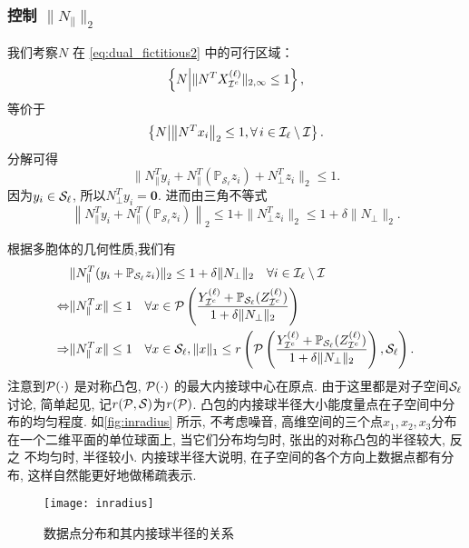 \subsubsection{控制 \(\|N_{\parallel}\|_2\)}
我们考察\(N\) 在 \eqref{eq:dual_fictitious2} 中的可行区域：
\[\left\{N \middle| \|N^T X^{(\ell)}_{\mathcal{I}^c}\|_{2,\infty} \leq 1\right\},\]
等价于
\[\left\{N \middle|\left \| N^T x_i\right\|_2 \leq 1 , \forall \, i \in \mathcal{I}_\ell
\setminus \mathcal{I} \right\}.\]
分解可得
\[\| N_{\parallel}^T y_i+N_{\parallel}^T (\mathbb{P}_{\mathcal{S}_{\ell}}z_i)+
N_{\perp}^T z_i\|_2 \leq 1.\]
因为\(y_i \in \mathcal{S}_\ell\), 所以\(N_\perp^T y_i=\mathbf{0}\). 进而由三角不等式
\begin{equation}\label{eq:relax_constraint}
  \left\| N_{\parallel}^T y_i+N_{\parallel}^T
  (\mathbb{P}_{\mathcal{S}_{\ell}}z_i)\right \|_2
  \leq 1+\|N_{\perp}^T z_i\|_2 \leq 1+\delta\|N_{\perp}\|_2.
\end{equation}

根据多胞体的几何性质,我们有
\begin{align}
  & \| N_{\parallel}^T (y_i+ \mathbb{P}_{\mathcal{S}_{\ell}}z_i) \|_2 \leq
  1+\delta\|N_{\perp}\|_2 \quad \forall i \in \mathcal{I}_\ell \setminus \mathcal{I}\nonumber\\
  \Leftrightarrow & \|N_{\parallel}^T x\| \leq 1 \quad \forall x \in \mathcal{P}\left(\frac{Y_{\mathcal{I}^c}^{(\ell)}+
  \mathbb{P}_{\mathcal{S}_{\ell}}(Z_{\mathcal{I}^c}^{(\ell)})}{1+\delta\|N_{\perp}\|_2}\right)
  \nonumber\\
  \Rightarrow & \|N_{\parallel}^T x\| \leq 1 \quad \forall x \in \mathcal{S}_\ell,
  \|x\|_1 \le r\left(\mathcal{P}\left(\frac{Y_{\mathcal{I}^c}^{(\ell)}+
  \mathbb{P}_{\mathcal{S}_{\ell}}(Z_{\mathcal{I}^c}^{(\ell)})}{1+\delta\|N_{\perp}\|_2}\right),
  \mathcal{S}_\ell\right).\label{eq:Geometric_dual}
\end{align}
注意到\(\mathcal{P}(\cdot)\) 是对称凸包, \(\mathcal{P}(\cdot)\) 的最大内接球中心在原点.
由于这里都是对子空间\(\mathcal{S}_\ell\)讨论, 简单起见, 记\(r(\mathcal{P}, \mathcal{S})\)为\(r(\mathcal{P})\).
凸包的内接球半径大小能度量点在子空间中分布的均匀程度.
如\autoref{fig:inradius} 所示, 不考虑噪音, 高维空间的三个点\(x_1, x_2,
x_3\)分布在一个二维平面的单位球面上, 当它们分布均匀时, 张出的对称凸包的半径较大, 反之
不均匀时, 半径较小. 内接球半径大说明, 在子空间的各个方向上数据点都有分布,
这样自然能更好地做稀疏表示.

\begin{figure}[tb]
  \centering
  \texttt{[image: inradius]}
  \caption{数据点分布和其内接球半径的关系}
  \label{fig:inradius}
\end{figure}

